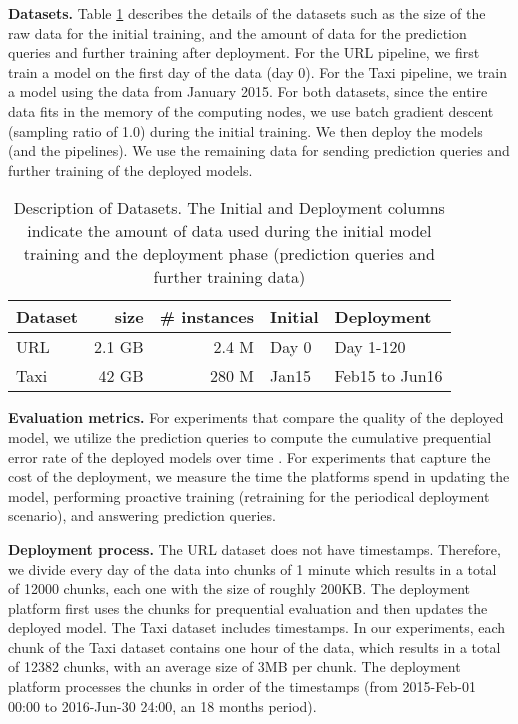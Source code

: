 \textbf{Datasets. }
Table \ref{dataset-description} describes the details of the datasets such as the size of the raw data for the initial training, and the amount of data for the prediction queries and further training after deployment. 
For the URL pipeline, we first train a model on the first day of the data (day 0).
For the Taxi pipeline, we train a model using the data from January 2015.
For both datasets, since the entire data fits in the memory of the computing nodes, we use batch gradient descent (sampling ratio of 1.0) during the initial training.
We then deploy the models (and the pipelines).
We use the remaining data for sending prediction queries and further training of the deployed models.
\begin{table}[h!]
\centering
\begin{tabular}{lrrll}
\hline
\textbf{Dataset}  & \textbf{size} &\textbf{\# instances} & \textbf{Initial} & \textbf{Deployment} \\
\hline
URL        &  2.1 GB 	& 2.4 M  			& Day 0        	  & Day 1-120          \\
Taxi        &  42 GB 	    & 280 M            & Jan15              & Feb15 to Jun16    \\
\hline
\end{tabular}
\caption{Description of Datasets. The Initial and Deployment columns indicate the amount of data used during the initial model training and the deployment phase (prediction queries and further training data)}  
 \vspace{-25pt}
\label{dataset-description}
\end{table}

\textbf{Evaluation metrics. }
For experiments that compare the quality of the deployed model, we utilize the prediction queries to compute the cumulative prequential error rate of the deployed models over time \cite{dawid1984present}.
For experiments that capture the cost of the deployment, we measure the time the platforms spend in updating the model, performing proactive training (retraining for the periodical deployment scenario), and answering prediction queries.

\textbf{Deployment process.}
The URL dataset does not have timestamps. 
Therefore, we divide every day of the data into chunks of 1 minute which results in a total of 12000 chunks, each one with the size of roughly 200KB.
The deployment platform first uses the chunks for prequential evaluation and then updates the deployed model.
The Taxi dataset includes timestamps. 
In our experiments, each chunk of the Taxi dataset contains one hour of the data, which results in a total of 12382 chunks, with an average size of 3MB per chunk. 
The deployment platform processes the chunks in order of the timestamps (from 2015-Feb-01  00:00 to 2016-Jun-30 24:00, an 18 months period).

